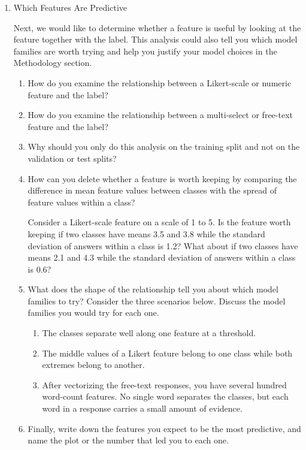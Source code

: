 \documentclass[12pt]{article}
\begin{document}
\begin{enumerate}
\begin{enumerate}
\end{enumerate}

\item Which Features Are Predictive

\smallskip
Next, we would like to determine whether a feature is useful by looking at the feature
together with the label. This analysis could also tell you which model families are
worth trying and help you justify your model choices in the Methodology section.
\smallskip

\begin{enumerate}

\item How do you examine the relationship between a Likert-scale or numeric feature and
  the label?

\item How do you examine the relationship between a multi-select or free-text feature
  and the label?

\item Why should you only do this analysis on the training split and not on the
  validation or test splits?

\item How can you delete whether a feature is worth keeping by comparing the difference
  in mean feature values between classes with the spread of feature values within a
  class?

\smallskip
Consider a Likert-scale feature on a scale of 1 to 5. Is the feature worth keeping if
two classes have means 3.5 and 3.8 while the standard deviation of answers within a
class is 1.2? What about if two classes have means 2.1 and 4.3 while the standard
deviation of answers within a class is 0.6?

\item What does the shape of the relationship tell you about which model families to
  try? Consider the three scenarios below. Discuss the model families you would try for
  each one.
\begin{enumerate}
\item The classes separate well along one feature at a threshold.
\item The middle values of a Likert feature belong to one class while both extremes
  belong to another.
\item After vectorizing the free-text responses, you have several hundred word-count
  features. No single word separates the classes, but each word in a response carries a
  small amount of evidence.
\end{enumerate}

\item Finally, write down the features you expect to be the most predictive, and name
  the plot or the number that led you to each one.

\end{enumerate}

\end{enumerate}
\end{document}
